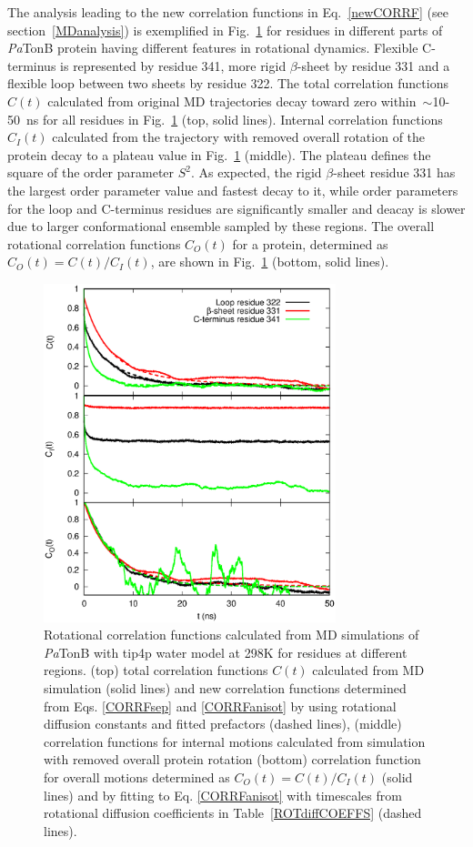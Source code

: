 \documentclass[pre,aps,floatfix,authordate1-4,twocolumn]{revtex4-1}
\begin{document}
The analysis leading to the new correlation functions in Eq.~\ref{newCORRF}
(see section~\ref{MDanalysis}) is exemplified in
Fig.~\ref{exampleCORRF} for residues in different parts of {\it Pa}TonB
protein having different features in rotational dynamics.
Flexible C-terminus is represented by residue 341,
more rigid $\beta$-sheet by residue 331 and a
flexible loop between two sheets by residue 322. 
The total correlation functions $C(t)$ calculated from original MD trajectories
decay toward zero within~$\sim$10-50~ns for all residues in Fig.~\ref{exampleCORRF}  (top, solid lines). 
Internal correlation functions $C_I(t)$ calculated from the trajectory with
removed overall rotation of the protein decay to a plateau value in Fig.~\ref{exampleCORRF} (middle).
The plateau defines the square of the order parameter $S^2$.
As expected, the rigid $\beta$-sheet residue 331 has the largest order parameter value
and fastest decay to it, while order parameters for the loop and C-terminus residues are
significantly smaller and deacay is slower due to larger conformational ensemble
sampled by these regions. The overall rotational correlation functions $C_O(t)$
for a protein, determined as $C_O(t)=C(t)/C_I(t)$, are shown in Fig.~\ref{exampleCORRF} (bottom, solid lines).
\begin{figure}[!h]
  \includegraphics[width=8.5cm]{../Figs/exampleCORRF2.eps}%
  \caption{Rotational correlation functions calculated from MD simulations of {\it Pa}TonB with tip4p water
    model at 298K for residues at different regions.
    (top) total correlation functions $C(t)$ calculated from MD simulation (solid lines) and
    new correlation functions determined from Eqs. \ref{CORRFsep} and \ref{CORRFanisot} by
    using rotational diffusion constants and fitted prefactors (dashed lines),
    (middle) correlation functions for internal motions calculated from simulation with removed overall protein rotation
    (bottom) correlation function for overall motions determined as $C_O(t)=C(t)/C_I(t)$ (solid lines) and by fitting
    to Eq. \ref{CORRFanisot} with timescales from rotational diffusion coefficients in Table~\ref{ROTdiffCOEFFS} (dashed lines).
    }\label{exampleCORRF}
\end{figure}
\end{document}
